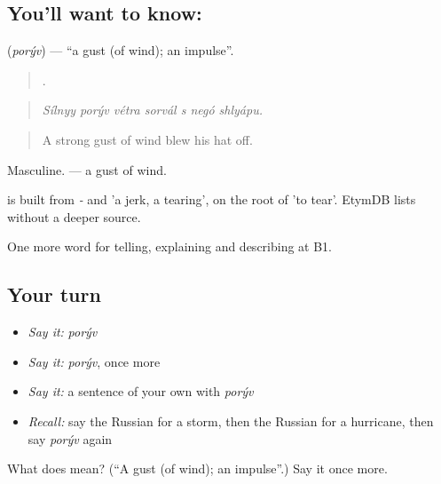 \subsection*{You'll want to know: }
\textbf{} (\emph{porýv}) — \textquotedblleft{}a gust (of wind); an impulse\textquotedblright{}.

\begin{quote}
      .
\end{quote}

\begin{quote}
\emph{Sílnyy porýv vétra sorvál s negó shlyápu.}
\end{quote}

\begin{quote}
A strong gust of wind blew his hat off.
\end{quote}

Masculine. \emph{ } — a gust of wind.

\begin{cousinweb}
\emph{} is built from \emph{-} and \emph{} 'a jerk, a tearing', on the root of \emph{} 'to tear'. EtymDB lists \emph{} without a deeper source.
\end{cousinweb}

\begin{grammarlens}[title={What you've built}]
One more word for telling, explaining and describing at B1.
\end{grammarlens}

\subsection*{Your turn}
\begin{itemize}
\raggedright
  \item \emph{Say it:} \emph{porýv}
  \item \emph{Say it:} \emph{porýv}, once more
  \item \emph{Say it:} a sentence of your own with \emph{porýv}
  \item \emph{Recall:} say the Russian for a storm, then the Russian for a hurricane, then say \emph{porýv} again
\end{itemize}

\begin{tcolorbox}[breakable,colback=teal!4,colframe=teal!35!black,title={Before you move on}]
What does  mean? (\textquotedblleft{}A gust (of wind); an impulse\textquotedblright{}.) Say it once more.
\end{tcolorbox}
